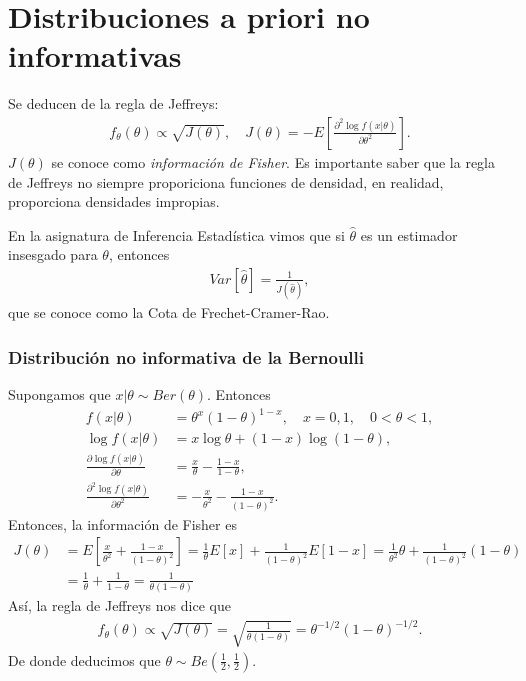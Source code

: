 \section{Distribuciones a priori no informativas}
Se deducen de la regla de Jeffreys:
\begin{align*}
    f_{\theta}(\theta) \propto \sqrt{J(\theta)}, \quad J(\theta) = - E \left[ \frac{\partial^2 \log f(x | \theta)}{\partial \theta^2} \right].
\end{align*}
$J(\theta)$ se conoce como \textit{información de Fisher}. Es importante saber que la regla de Jeffreys no siempre proporiciona funciones de densidad, en realidad, proporciona densidades impropias.
\begin{obs}
    En la asignatura de Inferencia Estadística vimos que si $\widehat{\theta}$ es un estimador insesgado para $\theta$, entonces
    \begin{align*}
        Var[ \widehat{\theta}] = \frac{1}{J( \widehat{\theta})},
    \end{align*}
    que se conoce como la Cota de Frechet-Cramer-Rao.
\end{obs}

\subsubsection{Distribución no informativa de la Bernoulli}
Supongamos que $x | \theta \sim Ber(\theta)$. Entonces
\begin{align*}
    f(x | \theta)                                           & = \theta^x(1-\theta)^{1-x}, \quad x=0,1, \quad 0 < \theta < 1, \\
    \log f(x | \theta)                                      & = x \log \theta + (1 - x) \log (1 -\theta),                    \\
    \frac{\partial \log f(x | \theta)}{\partial \theta}     & = \frac{x}{\theta} - \frac{1-x}{1-\theta},                     \\
    \frac{\partial^2 \log f(x | \theta)}{\partial \theta^2} & = - \frac{x}{\theta^2} - \frac{1-x}{(1-\theta)^2}.
\end{align*}
Entonces, la información de Fisher es
\begin{align*}
    J(\theta) & = E \left[ \frac{x}{\theta^2} + \frac{1-x}{(1-\theta)^2}\right] = \frac{1}{\theta} E[x] + \frac{1}{(1-\theta)^2}E[1-x] = \frac{1}{\theta^2}\theta + \frac{1}{(1-\theta)^2}(1-\theta) \\
              & = \frac{1}{\theta} + \frac{1}{1-\theta} = \frac{1}{\theta(1-\theta)}
\end{align*}
Así, la regla de Jeffreys nos dice que
\begin{align*}
    f_{\theta}(\theta) \propto \sqrt{J(\theta)} = \sqrt{\frac{1}{\theta(1-\theta)}} = \theta^{-1/2}(1-\theta)^{-1/2}.
\end{align*}
De donde deducimos que $\theta \sim Be\left( \frac{1}{2}, \frac{1}{2} \right)$.

